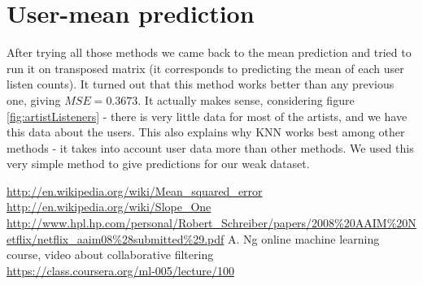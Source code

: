 \documentclass{report}
\begin{document}
\section{User-mean prediction}
After trying all those methods we came back to the mean prediction and tried to run it on transposed matrix (it corresponds to predicting the mean of each user listen counts). It turned out that this method works better than any previous one, giving $MSE=0.3673$. It actually makes sense, considering figure \ref{fig:artistListeners} - there is very little data for most of the artists, and we have this data about the users. This also explains why KNN works best among other methods - it takes into account user data more than other methods. We used this very simple method to give predictions for our weak dataset.

\begingroup
\renewcommand{\cleardoublepage}{}
\renewcommand{\clearpage}{}
\begin{thebibliography}{9}

  \url{http://en.wikipedia.org/wiki/Mean_squared_error}
  \url{http://en.wikipedia.org/wiki/Slope_One}
  \url{http://www.hpl.hp.com/personal/Robert_Schreiber/papers/2008\%20AAIM\%20Netflix/netflix_aaim08\%28submitted\%29.pdf}
   A. Ng online machine learning course,
   video about collaborative filtering\\
  \url{https://class.coursera.org/ml-005/lecture/100}


\end{thebibliography}
\endgroup
\end{document}
